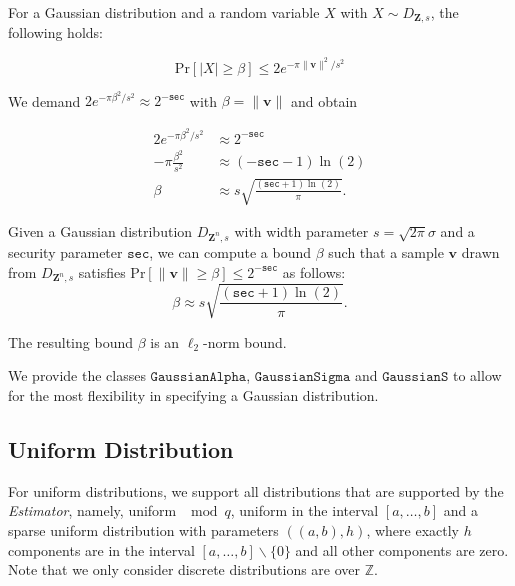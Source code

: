 For a Gaussian distribution and a random variable $X$ with $X \sim D_{\mathbf{Z}, s}$, the following holds: %

\begin{equation}
    \text{Pr}\left[ |X| \geq \beta \right] \leq 2 e^{-\pi \|\mathbf{v}\|^2/s^2}
\end{equation}

We demand $2 e^{-\pi \beta^2/s^2} \approx 2^{-\texttt{sec}}$ with $\beta = \|\mathbf{v}\|$  and obtain

\begin{align*}
    2 e^{-\pi \beta^2/s^2}   & \approx 2^{-\texttt{sec}}                               \\
    -\pi \frac{\beta^2}{s^2} & \approx (-\texttt{sec} - 1)\ln (2)                      \\
    \beta                    & \approx s \sqrt{\frac{(\texttt{sec} + 1) \ln(2)}{\pi}}.
\end{align*}

\begin{theorem}
    Given a Gaussian distribution $D_{\mathbf{Z}^n, s}$ with width parameter $s  = \sqrt{2 \pi} \sigma$ and a security parameter $\texttt{sec}$, we can compute a bound $\beta$ such that a sample $\mathbf{v}$ drawn from $D_{\mathbf{Z}^n, s}$ satisfies $\text{Pr}\left[ \|\mathbf{v}\| \geq \beta \right] \leq 2^{-\texttt{sec}}$ as follows:
    \begin{equation}
        \beta  \approx s \sqrt{\frac{(\texttt{sec} + 1) \ln(2)}{\pi}}.
    \end{equation}
\end{theorem}

The resulting bound $\beta$ is an $\ell_2$-norm bound. %

We provide the classes $\texttt{GaussianAlpha}$, $\texttt{GaussianSigma}$ and $\texttt{GaussianS}$ to allow for the most flexibility in specifying a Gaussian distribution.

\subsection{Uniform Distribution}
For uniform distributions, we support all distributions that are supported by the \textit{Estimator}, namely, uniform $\mod q$, uniform in the interval $[a,\dots,b]$ and a sparse uniform distribution with parameters $((a,b), h)$, where exactly $h$ components are in the interval $[a,\dots,b] \backslash \{0\}$ and all other components are zero. Note that we only consider discrete distributions are over $\mathbb{Z}$.

